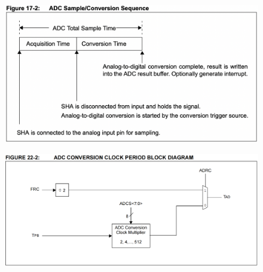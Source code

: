 \documentclass[a4paper]{article}
\begin{document}
\begin{enumerate}[label = \arabic*.]
      \begin{figure}[H]
        \centering
        \includegraphics[width=0.8\linewidth]{ADC_sequence.png}
        \label{fig:ADC_sequence.png}
      \end{figure}

      \begin{figure}[H]
        \centering
        \includegraphics[width=0.8\linewidth]{ADC_clock_source.png}
        \label{fig:ADC_clock_source.png}
      \end{figure}


\end{enumerate}
\end{document}
